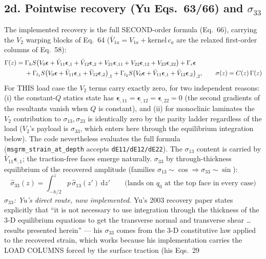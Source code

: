 \documentclass[11pt]{article}
\newcommand{\code}[1]{\texttt{#1}}
\begin{document}
\subsection*{2d.  Pointwise recovery (Yu Eqs.~63/66) and $\sigma_{33}$}
The implemented recovery is the full SECOND-order formula (Eq.~66), carrying the
$V_2$ warping blocks of Eq.~64 ($\bar V_{1a} = V_{1a} + \mathrm{kernel}\,c_a$ are the
relaxed first-order columns of Eq.~58):
\begin{align}
\Gamma(z) ={}& \Gamma_h S\big(V_0\bm\epsilon + \bar V_{11}\bm\epsilon_{,1}
 + \bar V_{12}\bm\epsilon_{,2}
 + V_{21}\bm\epsilon_{,11} + V_{22}\bm\epsilon_{,12} + V_{23}\bm\epsilon_{,22}\big)
 + \Gamma_\epsilon\bm\epsilon \notag\\
 &+ \Gamma_{l_1}S\big(V_0\bm\epsilon + \bar V_{11}\bm\epsilon_{,1}
 + \bar V_{12}\bm\epsilon_{,2}\big)_{,1}
 + \Gamma_{l_2}S\big(V_0\bm\epsilon + \bar V_{11}\bm\epsilon_{,1}
 + \bar V_{12}\bm\epsilon_{,2}\big)_{,2},
\qquad \sigma(z) = C(z)\,\Gamma(z)
\end{align}
For THIS load case the $V_2$ terms carry exactly zero, for two independent reasons:
(i) the constant-$Q$ statics state has $\bm\epsilon_{,11} = \bm\epsilon_{,12} =
\bm\epsilon_{,22} = 0$ (the second gradients of the resultants vanish when $Q$ is
constant), and (ii) for monoclinic laminates the $V_2$ contribution to
$\sigma_{13},\sigma_{23}$ is identically zero by the parity ladder regardless of the
load ($V_2$'s payload is $\sigma_{33}$, which enters here through the equilibrium
integration below).  The code nevertheless evaluates the full formula
(\code{msgrm\_strain\_at\_depth} accepts \code{dE11/dE12/dE22}).
The $\sigma_{13}$ content is carried by $\bar V_{11}\bm\epsilon_{,1}$; the
traction-free faces emerge naturally.  $\sigma_{33}$ by through-thickness equilibrium
of the recovered amplitude (families $\sigma_{13}\sim\cos \Rightarrow
\sigma_{33}\sim\sin$):
\begin{equation}
\hat\sigma_{33}(z) = \int_{-h/2}^{z} p\,\hat\sigma_{13}(z')\,\mathrm dz'
\qquad\text{(lands on } q_0 \text{ at the top face in every case)}
\end{equation}
\emph{$\sigma_{33}$: Yu's direct route, now implemented.}  Yu's 2003 recovery paper
states explicitly that ``it is not necessary to use integration through the thickness
of the 3-D equilibrium equations to get the transverse normal and transverse shear
\dots{} results presented herein'' --- his $\sigma_{33}$ comes from the 3-D
constitutive law applied to the recovered strain, which works because his
implementation carries the LOAD COLUMNS forced by the surface traction (his Eqs.~29
\end{document}
